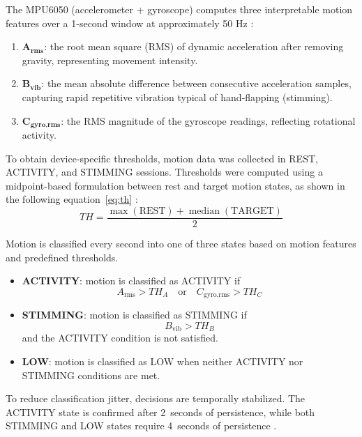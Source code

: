 \documentclass[a4paper,12pt]{report}
\begin{document}
The MPU6050 (accelerometer + gyroscope) computes three interpretable motion features over a 1-second window at approximately 50 Hz : 
\begin{enumerate}[label=(\arabic*)]
    \item $\mathbf{A_{\text{rms}}}$: the root mean square (RMS) of dynamic acceleration after removing gravity, representing movement intensity.
    
    \item $\mathbf{B_{\text{vib}}}$: the mean absolute difference between consecutive acceleration samples, capturing rapid repetitive vibration typical of hand-flapping (stimming).
    
    \item $\mathbf{C_{\text{gyro,rms}}}$: the RMS magnitude of the gyroscope readings, reflecting rotational activity.
\end{enumerate}

To obtain device-specific thresholds, motion data was collected in REST, ACTIVITY, and STIMMING sessions. Thresholds were computed using a midpoint-based formulation between rest and target motion states, as shown in the following equation~\eqref{eq:th} \cite{tum_motion_2013}:\\[0.1cm]

\begin{equation}
TH = \frac{\max(\mathrm{REST}) + \operatorname{median}(\mathrm{TARGET})}{2}
\label{eq:th}
\end{equation}


Motion is classified every second into one of three states based on motion features and predefined thresholds.

\begin{itemize}
    \item \textbf{ACTIVITY}: motion is classified as ACTIVITY if \cite{foerster_activity_1999}
    \[
    A_{\text{rms}} > TH_A \quad \text{or} \quad C_{\text{gyro,rms}} > TH_C
    \]

    \item \textbf{STIMMING}: motion is classified as STIMMING if \cite{tum_motion_2013}
    \[
    B_{\text{vib}} > TH_B
    \]
    and the ACTIVITY condition is not satisfied.

    \item \textbf{LOW}: motion is classified as LOW when neither ACTIVITY nor STIMMING conditions are met.
\end{itemize}

To reduce classification jitter, decisions are temporally stabilized. The ACTIVITY state is confirmed after 2~seconds of persistence, while both STIMMING and LOW states require 4~seconds of persistence \cite{tum_motion_2013}.
\end{document}
